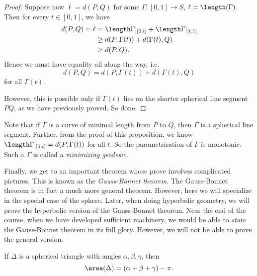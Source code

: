 \documentclass[a4paper]{article}
\begin{document}
\begin{proof}
  Suppose now $\ell = d(P, Q)$ for some $\Gamma: [0, 1] \to S$, $\ell = \length(\Gamma)$. Then for every $t \in [0, 1]$, we have
  \begin{align*}
    d(P, Q) = \ell &= \length \Gamma|_{[0, t]} + \length \Gamma|_{[t, 1]} \\
    &\geq d(P, \Gamma(t)) + d(\Gamma(t), Q)\\
    &\geq d(P, Q).
  \end{align*}
  Hence we must have equality all along the way, i.e.
  \[
    d(P, Q) = d(P, \Gamma(t)) + d(\Gamma(t), Q)
  \]
  for all $\Gamma(t)$.

  However, this is possible only if $\Gamma(t)$ lies on the shorter spherical line segment $PQ$, as we have previously proved. So done.
\end{proof}

Note that if $\Gamma$ is a curve of minimal length from $P$ to $Q$, then $\Gamma$ is a spherical line segment. Further, from the proof of this proposition, we know $\length \Gamma|_{[0, t]} = d(P, \Gamma(t))$ for all $t$. So the parametrisation of $\Gamma$ is monotonic. Such a $\Gamma$ is called a \emph{minimizing geodesic}.

Finally, we get to an important theorem whose prove involves complicated pictures. This is known as the \emph{Gauss-Bonnet theorem}. The Gauss-Bonnet theorem is in fact a much more general theorem. However, here we will specialize in the special case of the sphere. Later, when doing hyperbolic geometry, we will prove the hyperbolic version of the Gauss-Bonnet theorem. Near the end of the course, when we have developed sufficient machinery, we would be able to \emph{state} the Gauss-Bonnet theorem in its full glory. However, we will not be able to prove the general version.

\begin{prop}
  If $\Delta$ is a spherical triangle with angles $\alpha, \beta, \gamma$, then
  \[
    \area (\Delta) = (\alpha + \beta + \gamma) - \pi.
  \]
\end{prop}
\end{document}
